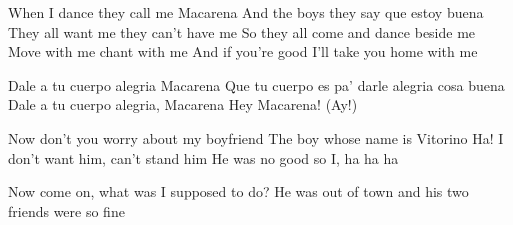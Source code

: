 \begin{verse*}
When I dance they call me Macarena
And the boys they say que estoy buena
They all want me
they can't have me
So they all come and dance beside me
Move with me
chant with me
And if you're good I'll take you home with me
\end{verse*}

\begin{chorus}
Dale a tu cuerpo alegria Macarena
Que tu cuerpo es pa' darle alegria cosa buena
Dale a tu cuerpo alegria, Macarena
Hey Macarena!
(Ay!)
\end{chorus}

\thechorus

\begin{verse*}
Now don't you worry about my boyfriend
The boy whose name is Vitorino
Ha! I don't want him, can't stand him
He was no good so I, ha ha ha
\end{verse*}

\begin{bridge*}
Now come on, what was I supposed to do?
He was out of town and his two friends were so fine
\end{bridge*}

